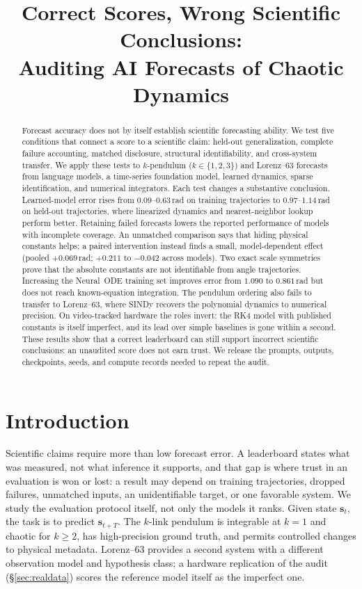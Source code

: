 \documentclass{article}
\title{Correct Scores, Wrong Scientific Conclusions:\\
Auditing AI Forecasts of Chaotic Dynamics}
\author{}
\begin{document}
\maketitle

\begin{abstract}
Forecast accuracy does not by itself establish scientific forecasting ability. We test five
conditions that connect a score to a scientific claim: held-out generalization, complete
failure accounting, matched disclosure, structural identifiability, and cross-system
transfer. We apply these tests to $k$-pendulum ($k\in\{1,2,3\}$) and Lorenz--63 forecasts from
language models, a time-series foundation model, learned dynamics, sparse identification, and
numerical integrators. Each test changes a substantive conclusion. Learned-model error rises
from $0.09$--$0.63$\,rad on training trajectories to $0.97$--$1.14$\,rad on held-out
trajectories, where linearized dynamics and nearest-neighbor lookup perform better. Retaining
failed forecasts lowers the reported performance of models with incomplete coverage. An
unmatched comparison says that hiding physical constants helps; a paired intervention instead
finds a small, model-dependent effect (pooled $+0.069$\,rad; $+0.211$ to $-0.042$ across models). Two exact scale symmetries prove that the absolute constants are
not identifiable from angle trajectories. Increasing the Neural~ODE training set improves
error from $1.090$ to $0.861$\,rad but does not reach known-equation integration. The pendulum
ordering also fails to transfer to Lorenz--63, where SINDy recovers the polynomial dynamics to
numerical precision. On video-tracked hardware the roles invert: the RK4 model with published
constants is itself imperfect, and its lead over simple baselines is gone within a second.
These results show that a correct leaderboard can still support incorrect
scientific conclusions: an unaudited score does not earn trust. We release the prompts,
outputs, checkpoints, seeds, and compute records needed to repeat the audit.
\end{abstract}

\section{Introduction}
Scientific claims require more than low forecast error. A leaderboard states what was
measured, not what inference it supports, and that gap is where trust in an evaluation is
won or lost: a result may depend on training trajectories, dropped failures, unmatched
inputs, an unidentifiable target, or one favorable system. We study the evaluation
protocol itself, not only the models it ranks. Given state $\mathbf{s}_t$, the task is to
predict $\mathbf{s}_{t+T}$. The $k$-link pendulum is integrable at $k{=}1$ and chaotic for
$k{\ge}2$, has high-precision ground truth, and permits controlled changes to physical
metadata. Lorenz--63 provides a second system with a different observation model and
hypothesis class; a hardware replication of the audit (\S\ref{sec:realdata}) scores the
reference model itself as the imperfect one.
\end{document}
